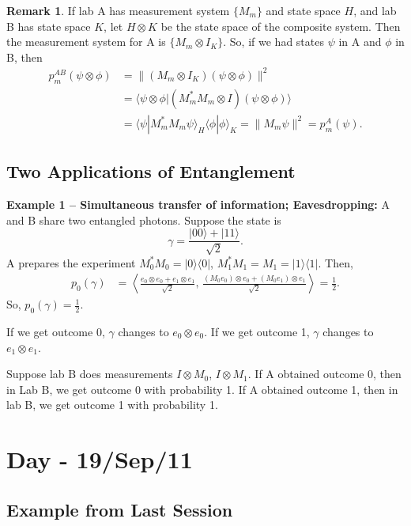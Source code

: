 \documentclass[12pt]{article}
\theoremstyle{definition}
\newtheorem*{remark}{Remark}
\newcommand{\ket}[1]{|#1\rangle}
\newcommand{\bra}[1]{\langle #1|}
\newcommand{\norm}[1]{\|#1\|}
\begin{document}
\begin{remark}
If lab A has measurement system $\{M_m\}$ and state space $H$, and lab B has state space $K$, let $H \otimes K$ be the state space of the composite system. Then the measurement system for A is $\{M_m \otimes I_K\}$. So, if we had states $\psi$ in A and $\phi$ in B, then
\begin{align*}
p_m^{AB}(\psi \otimes \phi) &= \norm{(M_m \otimes I_K)(\psi \otimes \phi)}^2 \\
&= \langle\psi \otimes \phi|(M_m^*M_m \otimes I)(\psi \otimes \phi)\rangle \\
&= \langle\psi|M_m^*M_m\psi\rangle_H \langle\phi|\phi\rangle_K = \norm{M_m\psi}^2 = p_m^A(\psi).
\end{align*}
\end{remark}

\subsection{Two Applications of Entanglement}

\textbf{Example 1 -- Simultaneous transfer of information; Eavesdropping:} A and B share two entangled photons. Suppose the state is
\[
\gamma = \frac{\ket{00}+\ket{11}}{\sqrt{2}}.
\]
A prepares the experiment $M_0^*M_0 = \ket{0}\bra{0}$, $M_1^*M_1 = M_1 = \ket{1}\bra{1}$.
Then,
\begin{align*}
p_0(\gamma) &= \left\langle \frac{e_0 \otimes e_0 + e_1 \otimes e_1}{\sqrt{2}},\, \frac{(M_0 e_0) \otimes e_0 + (M_0 e_1) \otimes e_1}{\sqrt{2}}\right\rangle = \tfrac{1}{2}.
\end{align*}
So, $p_0(\gamma) = \frac{1}{2}$.

If we get outcome 0, $\gamma$ changes to $e_0 \otimes e_0$. If we get outcome 1, $\gamma$ changes to $e_1 \otimes e_1$.

Suppose lab B does measurements $I \otimes M_0$, $I \otimes M_1$. If A obtained outcome 0, then in Lab B, we get outcome 0 with probability 1. If A obtained outcome 1, then in lab B, we get outcome 1 with probability 1.

\section{Day - 19/Sep/11}

\subsection{Example from Last Session}
\end{document}
